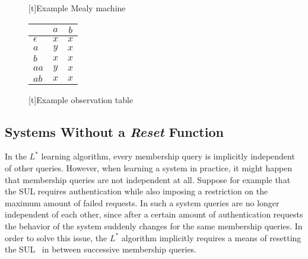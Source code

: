 \begin{figure}[h]
  \begin{minipage}{.45\textwidth}
    \centering
    [t]{Example Mealy machine}
    \label{fig:mealy_example}
  \end{minipage}
%
  \begin{minipage}{.45\textwidth}
    \centering
    \begin{tabular}{ | l || c | c | }
      \hline
                  & $a$   & $b$ \\ \hline \hline
      $\epsilon$  & $x$   & $x$ \\
      $a$         & $y$   & $x$ \\ \hline \hline
      $b$         & $x$   & $x$ \\
      $aa$        & $y$   & $x$ \\
      $ab$        & $x$   & $x$ \\
      \hline
    \end{tabular}
    [t]{Example observation table}
    \label{tbl:mealy_observation_table}
  \end{minipage}
\end{figure}


\subsection{Systems Without a \textit{Reset} Function}
\label{sec:noreset}
In the $L^*$ learning algorithm, every membership query is implicitly
independent of other queries. However, when learning a system in practice, it
might happen that membership queries are not independent at all. Suppose for
example that the SUL requires authentication while also imposing a restriction
on the maximum amount of failed requests. In such a system queries are no longer
independent of each other, since after a certain amount of authentication
requests the behavior of the system suddenly changes for the same membership
queries. In order to solve this issue, the $L^*$ algorithm implicitly requires a
means of resetting the SUL~\cite[p. 301]{Rivest1993} in between successive
membership queries.

